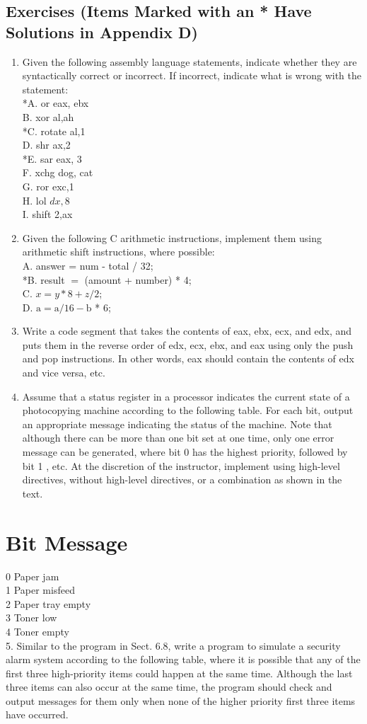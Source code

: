 \documentclass[10pt]{book}
\begin{document}
\subsection{Exercises (Items Marked with an * Have Solutions in Appendix D)}
\begin{enumerate}
  \item Given the following assembly language statements, indicate whether they are syntactically correct or incorrect. If incorrect, indicate what is wrong with the statement:\\
*A. or eax, ebx\\
B. xor al,ah\\
*C. rotate al,1\\
D. shr ax,2\\
*E. sar eax, 3\\
F. xchg dog, cat\\
G. ror exc,1\\
H. lol $d x, 8$\\
I. shift 2,ax
  \item Given the following C arithmetic instructions, implement them using arithmetic shift instructions, where possible:\\
A. answer = num - total / 32;\\
*B. result $=$ (amount + number) * 4;\\
C. $x=y * 8+z / 2$;\\
D. $\mathrm{a}=\mathrm{a} / 16-\mathrm{b}$ * 6;
  \item Write a code segment that takes the contents of eax, ebx, ecx, and edx, and puts them in the reverse order of edx, ecx, ebx, and eax using only the push and pop instructions. In other words, eax should contain the contents of edx and vice versa, etc.
  \item Assume that a status register in a processor indicates the current state of a photocopying machine according to the following table. For each bit, output an appropriate message indicating the status of the machine. Note that although there can be more than one bit set at one time, only one error message can be generated, where bit 0 has the highest priority, followed by bit 1 , etc. At the discretion of the instructor, implement using high-level directives, without high-level directives, or a combination as shown in the text.
\end{enumerate}

\section{Bit Message}
0 Paper jam\\
1 Paper misfeed\\
2 Paper tray empty\\
3 Toner low\\
4 Toner empty\\
5. Similar to the program in Sect. 6.8, write a program to simulate a security alarm system according to the following table, where it is possible that any of the first three high-priority items could happen at the same time. Although the last three items can also occur at the same time, the program should check and output messages for them only when none of the higher priority first three items have occurred.
\end{document}
